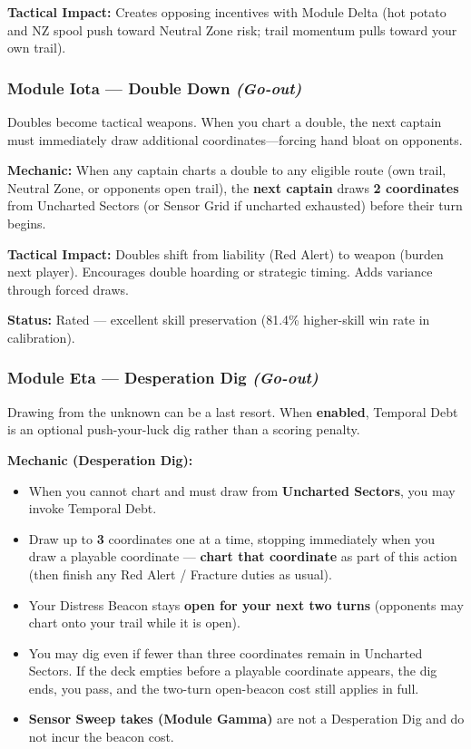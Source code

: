 \documentclass[11pt]{article}
\providecommand{\tightlist}{%
  \setlength{\itemsep}{0pt}\setlength{\parskip}{0pt}}
\begin{document}
\textbf{Tactical Impact:} Creates opposing incentives with Module Delta
(hot potato and NZ spool push toward Neutral Zone risk; trail momentum
pulls toward your own trail).

\subsubsection{Module Iota --- Double Down
\emph{(Go-out)}}\label{module-iota-double-down-go-out}

Doubles become tactical weapons. When you chart a double, the next
captain must immediately draw additional coordinates---forcing hand
bloat on opponents.

\textbf{Mechanic:} When any captain charts a double to any eligible
route (own trail, Neutral Zone, or opponent\textquotesingle s open
trail), the \textbf{next captain} draws \textbf{2 coordinates} from Uncharted
Sectors (or Sensor Grid if uncharted exhausted) before their turn
begins.

\textbf{Tactical Impact:} Doubles shift from liability (Red Alert) to
weapon (burden next player). Encourages double hoarding or strategic
timing. Adds variance through forced draws.

\textbf{Status:} Rated --- excellent skill preservation (81.4\%
higher-skill win rate in calibration).

\subsubsection{Module Eta --- Desperation Dig
\emph{(Go-out)}}\label{module-eta--desperation-dig-go-out}

Drawing from the unknown can be a last resort. When \textbf{enabled},
Temporal Debt is an optional push-your-luck dig rather than a scoring
penalty.

\textbf{Mechanic (Desperation Dig):}

\begin{itemize}
\tightlist
\item
  When you cannot chart and must draw from \textbf{Uncharted Sectors},
  you may invoke Temporal Debt.
\item
  Draw up to \textbf{3} coordinates one at a time, stopping immediately
  when you draw a playable coordinate --- \textbf{chart that
  coordinate} as part of this action (then finish any Red Alert /
  Fracture duties as usual).
\item
  Your Distress Beacon stays \textbf{open for your next two turns}
  (opponents may chart onto your trail while it is open).
\item
  You may dig even if fewer than three coordinates remain in Uncharted
  Sectors. If the deck empties before a playable coordinate appears, the
  dig ends, you pass, and the two-turn open-beacon cost still applies in
  full.
\item
  \textbf{Sensor Sweep takes (Module Gamma)} are not a Desperation Dig
  and do not incur the beacon cost.
\end{itemize}
\end{document}
